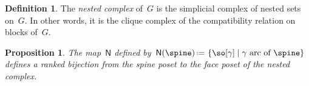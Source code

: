 \documentclass{amsart}
\newtheorem{corollary}[theorem]{Corollary}
\newtheorem{proposition}[theorem]{Proposition}
\newtheorem{lemma}[theorem]{Lemma}
\theoremstyle{definition}
\newtheorem{definition}[theorem]{Definition}
\newcommand{\set}[2]{\left\{ #1 \;\middle|\; #2 \right\}} %
\newcommand{\ssm}{\smallsetminus} %
\newcommand{\eqdef}{\mbox{\,\raisebox{0.2ex}{\scriptsize\ensuremath{\mathrm:}}\ensuremath{=}\,}} %
\newcommand{\viceversa}{\textit{vice versa}} %
\newcommand{\darkblue}{\color{darkblue}} %
\newcommand{\defn}[1]{\textsl{\darkblue #1}} %
\newcommand{\vincent}[1]{\todo[color=blue!30]{#1 \\ \hfill --- V.}}
\newcommand{\negDisjoint}{\perp} %
\newcommand{\posDisjoint}{\;\top\;} %
\newcommand{\compl}[1]{#1{}^\textsc{c}} %
\newcommand{\spineToNested}{\mathsf{N}} %
\begin{document}
\begin{definition}
  \label{def:spineComplex}
  The \defn{nested complex} of~$G$ is the simplicial complex of nested sets on~$G$.
  In other words, it is the clique complex of the compatibility relation on blocks of~$G$.
\end{definition}

%
%
%
%

\begin{proposition}
  \label{prop:spineToNested}
  The map~$\spineToNested$ defined by~$\spineToNested(\spine) \eqdef \set{\so[\gamma]}{\gamma \text{ arc of } \spine}$ defines a ranked bijection from the spine poset to the face poset of the nested complex.
\end{proposition}
\end{document}
